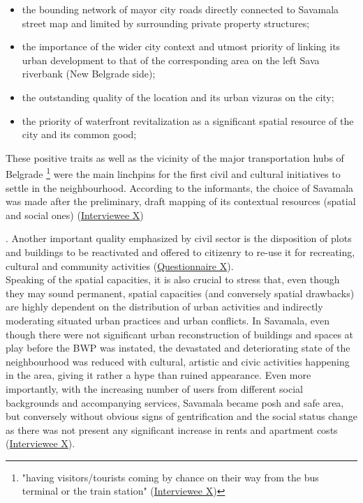 \documentclass[11pt]{report}
\begin{document}
{\begin{itemize}
\item the bounding network of mayor city roads directly connected to Savamala street map and limited by surrounding private property structures;
\item the importance of the wider city context and utmost priority of linking its urban development to that of the corresponding area on the left Sava riverbank (New Belgrade side);
\item the outstanding quality of the location and its urban vizuras on the city;
\item the priority of waterfront revitalization as a significant spatial resource of the city and its common good;
\end{itemize}

These positive traits as well as the vicinity of the major transportation hubs of Belgrade
\footnote{"having visitors/tourists coming by chance on their way from the bus terminal or the train station" (\href{InterviewX}{Interviewee X})}
were the main linchpins for the first civil and cultural initiatives to settle in the neighbourhood. According to the informants, the choice of Savamala was made after the preliminary, draft mapping of its contextual resources (spatial and social ones) (\href{InterviewX}{Interviewee X})}.
Another important quality emphasized by civil sector is the disposition of plots and buildings to be reactivated and offered to citizenry to re-use it for recreating, cultural and community activities (\href{Questionnaire Students Savamala}{Questionnaire X}).
\\

Speaking of the spatial capacities, it is also crucial to stress that, even though they may sound permanent, spatial capacities (and conversely spatial drawbacks) are highly dependent on the distribution of urban activities and indirectly moderating situated urban practices and urban conflicts.
In Savamala, even though there were not significant urban reconstruction of buildings and spaces at play before the BWP was instated, the devastated and deteriorating state of the neighbourhood was reduced with cultural, artistic and civic activities happening in the area, giving it rather a hype than ruined appearance.
Even more importantly, with the increasing number of users from different social backgrounds and accompanying services, Savamala became posh and safe area, but conversely without obvious signs of gentrification and the social status change as there was not present any significant increase in rents and apartment costs 
(\href{InterviewX}{Interviewee X}).
\\
\end{document}
